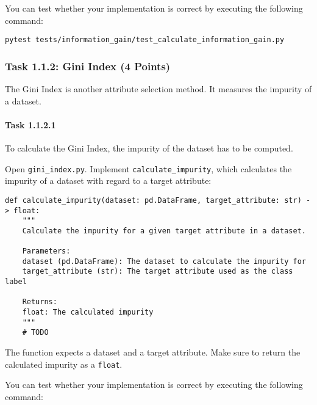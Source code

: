 \documentclass[
english,
smallborders
]{i6prcsht}
\newcommand{\points}[1]{\hfill \color{red}(#1 Points)\color{black}}
\begin{document}
You can test whether your implementation is correct by executing the following command:

\vspace*{0.3cm}

\begin{lstlisting}
pytest tests/information_gain/test_calculate_information_gain.py
\end{lstlisting}

\vspace*{0.1cm}

\subsubsection*{Task 1.1.2: Gini Index \points{4}}

The Gini Index is another attribute selection method. It measures the impurity of a dataset.

\paragraph*{Task 1.1.2.1} \hfill

To calculate the Gini Index, the impurity of the dataset has to be computed.

Open \texttt{gini\_index.py}. Implement \texttt{calculate\_impurity}, which calculates the impurity of a dataset with regard to a target attribute:

\vspace*{0.3cm}

\begin{lstlisting}
def calculate_impurity(dataset: pd.DataFrame, target_attribute: str) -> float:
    """
    Calculate the impurity for a given target attribute in a dataset.

    Parameters:
    dataset (pd.DataFrame): The dataset to calculate the impurity for
    target_attribute (str): The target attribute used as the class label

    Returns:
    float: The calculated impurity
    """
    # TODO
\end{lstlisting}

\vspace*{0.1cm}

The function expects a dataset and a target attribute. Make sure to return the calculated impurity as a \texttt{float}.

You can test whether your implementation is correct by executing the following command:

\vspace*{0.3cm}
\end{document}

